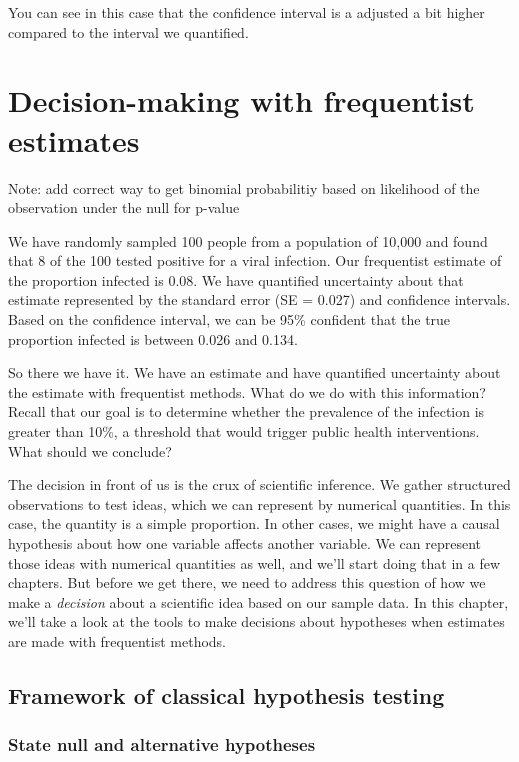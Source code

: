 \documentclass[
]{book}
\begin{document}
You can see in this case that the confidence interval is a adjusted a bit higher compared to the interval we quantified.

\chapter{Decision-making with frequentist estimates}\label{decision-making-with-frequentist-estimates}

Note: add correct way to get binomial probabilitiy based on likelihood of the observation under the null for p-value

We have randomly sampled 100 people from a population of 10,000 and found that 8 of the 100 tested positive for a viral infection. Our frequentist estimate of the proportion infected is 0.08. We have quantified uncertainty about that estimate represented by the standard error (SE = 0.027) and confidence intervals. Based on the confidence interval, we can be 95\% confident that the true proportion infected is between 0.026 and 0.134.

So there we have it. We have an estimate and have quantified uncertainty about the estimate with frequentist methods. What do we do with this information? Recall that our goal is to determine whether the prevalence of the infection is greater than 10\%, a threshold that would trigger public health interventions. What should we conclude?

The decision in front of us is the crux of scientific inference. We gather structured observations to test ideas, which we can represent by numerical quantities. In this case, the quantity is a simple proportion. In other cases, we might have a causal hypothesis about how one variable affects another variable. We can represent those ideas with numerical quantities as well, and we'll start doing that in a few chapters. But before we get there, we need to address this question of how we make a \emph{decision} about a scientific idea based on our sample data. In this chapter, we'll take a look at the tools to make decisions about hypotheses when estimates are made with frequentist methods.

\section{Framework of classical hypothesis testing}\label{framework-of-classical-hypothesis-testing}

\subsection{State null and alternative hypotheses}\label{state-null-and-alternative-hypotheses}
\end{document}
